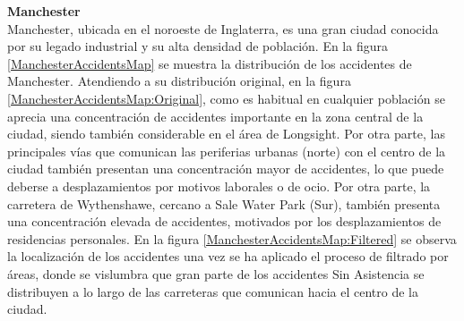 \textbf{Manchester}\\

Manchester, ubicada en el noroeste de Inglaterra, es una gran ciudad conocida por su legado industrial y su alta densidad de población. En la figura \ref{ManchesterAccidentsMap} se muestra la distribución de los accidentes de Manchester. Atendiendo a su distribución original, en la figura \ref{ManchesterAccidentsMap:Original}, como es habitual en cualquier población se aprecia una concentración de accidentes importante en la zona central de la ciudad, siendo también considerable en el área de Longsight. Por otra parte, las principales vías que comunican las periferias urbanas (norte) con el centro de la ciudad también presentan una concentración mayor de accidentes, lo que puede deberse a desplazamientos por motivos laborales o de ocio. Por otra parte, la carretera de Wythenshawe, cercano a Sale Water Park (Sur), también presenta una concentración elevada de accidentes, motivados por los desplazamientos de residencias personales. En la figura \ref{ManchesterAccidentsMap:Filtered} se observa la localización de los accidentes una vez se ha aplicado el proceso de filtrado por áreas, donde se vislumbra que gran parte de los accidentes Sin Asistencia se distribuyen a lo largo de las carreteras que comunican hacia el centro de la ciudad.


